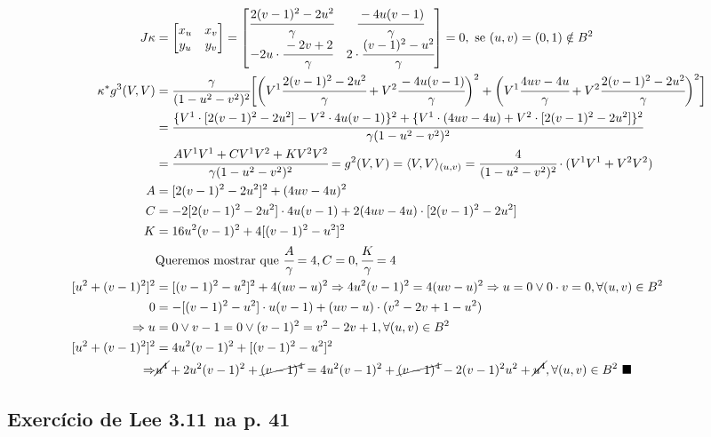 \documentclass[10pt,a4paper]{article}
\begin{document}
		\begin{align*}
		J\kappa &= \left[ \begin{matrix} x_u & x_v \\ y_u & y_v \end{matrix} \right] = \left[ \begin{matrix} \cfrac{2(v-1)^2 - 2u^2}{\gamma} & \cfrac{-4u(v-1)}{\gamma} \\ -2u \cdot \cfrac{-2v + 2}{\gamma} & 2 \cdot \cfrac{(v - 1)^2 - u^2}{\gamma} \end{matrix} \right] = 0, \text{ se } (u,v) = (0,1) \notin B^2 \\
		\kappa^* g^3(V,V) &= \cfrac{\gamma}{(1 - u^2 - v^2)^2} \bigg[\bigg(V^1 \cfrac{2(v-1)^2 - 2u^2}{\gamma} + V^2 \cfrac{-4u(v-1)}{\gamma}\bigg)^2 + \bigg(V^1 \cfrac{4uv - 4u}{\gamma} + V^2 \cfrac{2(v - 1)^2 - 2u^2}{\gamma}\bigg)^2\bigg] \\
		&= \cfrac{\{V^1 \cdot [2(v-1)^2 - 2u^2] - V^2 \cdot 4u(v-1)\}^2 + \{V^1 \cdot (4uv - 4u) + V^2 \cdot [2(v-1)^2 - 2u^2]\}^2}{\gamma(1 - u^2 - v^2)^2} \\
		&= \cfrac{A V^1 V^1 + C V^1 V^2 + K V^2 V^2}{\gamma(1 - u^2 - v^2)^2} =	g^2(V,V) = \langle V, V\rangle_{(u,v)} = \cfrac{4}{(1 - u^2 - v^2)^2} \cdot (V^1 V^1 + V^2 V^2) \\
		A &= [2(v-1)^2 - 2u^2]^2 + (4uv - 4u)^2 \\
		C &= - 2 [2(v-1)^2 - 2u^2] \cdot 4u(v-1) + 2 (4uv - 4u) \cdot [2(v-1)^2 - 2u^2] \\
		K &= 16u^2(v-1)^2 + 4[(v - 1)^2 - u^2]^2 \\
		&\text{Queremos mostrar que } \cfrac{A}{\gamma} = 4, C = 0, \cfrac{K}{\gamma} = 4 \\
		[u^2 + (v-1)^2]^2 &= [(v-1)^2 - u^2]^2 + 4(uv - u)^2 \Rightarrow 4 u^2 (v-1)^2 = 4(uv - u)^2 \Rightarrow u = 0 \vee 0\cdot v = 0, \forall (u, v) \in B^2 \\
		0 &= - [(v-1)^2 - u^2] \cdot u(v-1) + (uv - u) \cdot (v^2 - 2v + 1 - u^2) \\
		\Rightarrow u &= 0 \vee v - 1 = 0 \vee (v-1)^2 =  v^2 - 2v + 1, \forall (u,v) \in B^2 \\
		[u^2 + (v-1)^2]^2 &= 4u^2(v-1)^2 + [(v- 1)^2 - u^2]^2 \\
		\Rightarrow &\cancel{u^4} + 2 u^2 (v-1)^2 + \cancel{(v-1)^4} = 4u^2(v-1)^2 + \cancel{(v- 1)^4} - 2 (v-1)^2 u^2 + \cancel{u^4}, \forall (u,v) \in B^2 \,\,\blacksquare
		\end{align*}

		\subsection{Exerc\'icio de Lee 3.11 na p. 41}
		\begin{flushright}
		\end{flushright}
\end{document}
